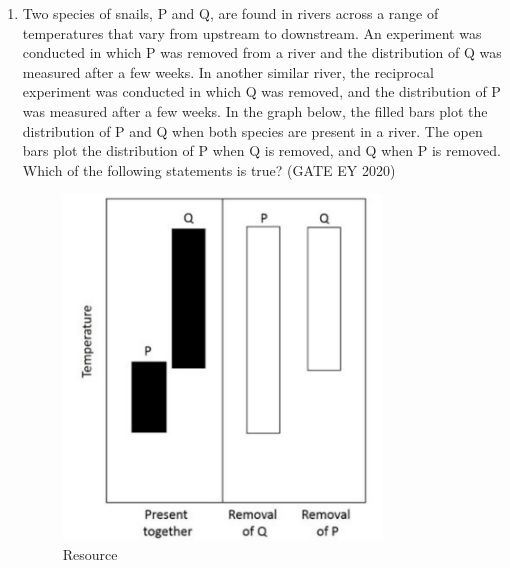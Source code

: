 \begin{enumerate}
\begin{multicols}{2}
\begin{enumerate}
\item Less than 6
\item Equal to 6
\item Between 6 and 12
\item Greater than 12
\end{enumerate}
\end{multicols}

\item
Two species of snails, P and Q, are found in rivers across a range of temperatures that vary from upstream to downstream. An experiment was conducted in which P was removed from a river and the distribution of Q was measured after a few weeks. In another similar river, the reciprocal experiment was conducted in which Q was removed, and the distribution of P was measured after a few weeks. In the graph below, the filled bars plot the distribution of P and Q when both species are present in a river. The open bars plot the distribution of P when Q is removed, and Q when P is removed. Which of the following statements is true? \hfill {(GATE EY 2020)}

\begin{center}
\begin{figure}[H]
    \includegraphics[width=0.8\textwidth]{figs/fig7.png}
\caption{Resource}
\label{fig:q14}
\end{figure}
\end{center}


\end{enumerate}
